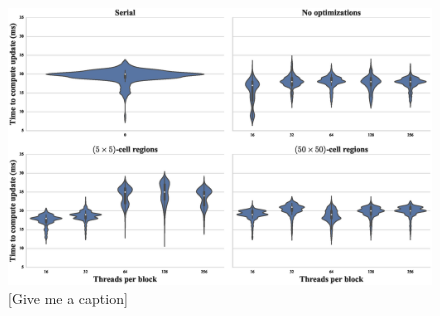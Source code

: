 \documentclass[onecolumn,12pt]{IEEEtran}
\begin{document}
  \begin{figure}[t]
    \centering
      \includegraphics[width=\textwidth]{../images/boxplot.eps}
    \caption{[Give me a caption]}
    \label{fig:boxplots}
  \end{figure}
\end{document}

